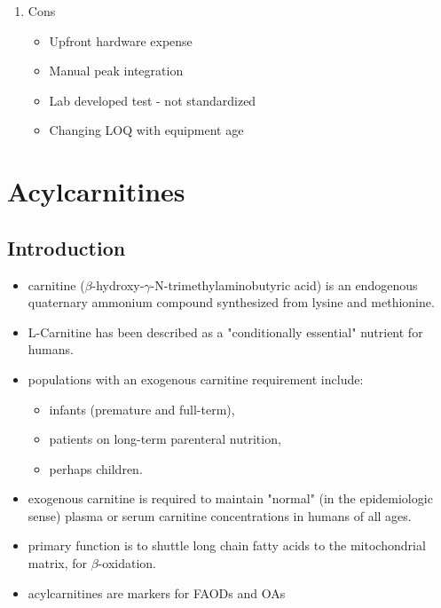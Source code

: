 \documentclass{scrartcl}
\begin{document}
\begin{enumerate}
\begin{enumerate}
\item Cons
\label{sec:org475f947}
\begin{itemize}
\item Upfront hardware expense
\item Manual peak integration
\item Lab developed test - not standardized
\item Changing LOQ with equipment age
\end{itemize}
\end{enumerate}
\end{enumerate}
\section{Acylcarnitines}
\label{sec:org86b983b}
\subsection{Introduction}
\label{sec:org6d8f8d0}
\begin{itemize}
\item carnitine (\(\beta\)-hydroxy-\(\gamma\)-N-trimethylaminobutyric acid) is
an endogenous quaternary ammonium compound synthesized from lysine
and methionine.
\item L-Carnitine has been described as a "conditionally essential"
nutrient for humans.
\item populations with an exogenous carnitine requirement include:
\begin{itemize}
\item infants (premature and full-term),
\item patients on long-term parenteral nutrition,
\item perhaps children.
\end{itemize}
\item exogenous carnitine is required to maintain "normal" (in the
epidemiologic sense) plasma or serum carnitine concentrations in
humans of all ages.
\item primary function is to shuttle long chain fatty acids to the
mitochondrial matrix, for \(\beta\)-oxidation.
\item acylcarnitines are markers for FAODs and OAs
\end{itemize}

\vspace{2em}

\hspace{3em}
\end{document}
